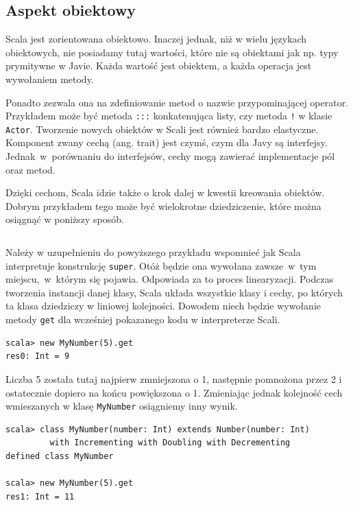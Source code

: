 \documentclass[wimgr]{xmgr}
\begin{document}
\subsection{Aspekt obiektowy}

Scala jest zorientowana obiektowo. Inaczej jednak, niż w wielu językach obiektowych, nie posiadamy tutaj wartości, które nie są obiektami jak np. typy prymitywne w Javie. Każda wartość jest obiektem, a każda operacja jest wywołaniem metody. 

Ponadto zezwala ona na zdefiniowanie metod o nazwie przypominającej operator. Przykładem może być metoda \texttt{:::} konkatenująca listy, czy metoda \texttt{!} w klasie \texttt{Actor}. Tworzenie nowych obiektów w Scali jest również bardzo elastyczne. Komponent zwany cechą (ang. trait) jest czymś, czym dla Javy są interfejsy. Jednak~w~porównaniu do interfejsów, cechy mogą zawierać implementacje pól oraz metod. 

Dzięki cechom, Scala idzie także o krok dalej w kwestii kreowania obiektów. Dobrym przykładem tego może być wielokrotne dziedziczenie, które można osiągnąć w poniższy sposób.

\inputminted[fontsize=\small]{scala}{code/multipleInheritance.scala}

Należy w uzupełnieniu do powyższego przykładu wspomnieć jak Scala interpretuje konstrukcję \texttt{super}. Otóż będzie ona wywołana zawsze~w~tym miejscu,~w~którym się pojawia. Odpowiada za to proces linearyzacji. Podczas tworzenia instancji danej klasy, Scala układa wszystkie klasy i cechy, po których ta klasa dziedziczy w liniowej kolejności. Dowodem niech będzie wywołanie metody \texttt{get} dla wcześniej pokazanego kodu w interpreterze Scali.

\begin{verbatim}
scala> new MyNumber(5).get
res0: Int = 9
\end{verbatim}

Liczba 5 została tutaj najpierw zmniejszona o 1, następnie pomnożona przez 2 i ostatecznie dopiero na końcu powiększona o 1. Zmieniając jednak kolejność cech wmieszanych w klasę \texttt{MyNumber} osiągniemy inny wynik.

\begin{verbatim}
scala> class MyNumber(number: Int) extends Number(number: Int) 
         with Incrementing with Doubling with Decrementing
defined class MyNumber

scala> new MyNumber(5).get
res1: Int = 11
\end{verbatim}
\end{document}
